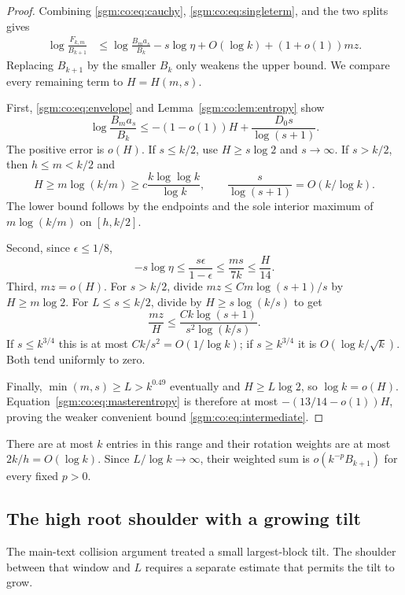 \documentclass[11pt,letterpaper]{article}
\theoremstyle{remark}\newtheorem{remark}[theorem]{Remark}
\theoremstyle{definition}\newtheorem{definition}[theorem]{Definition}
\begin{document}
\begin{proof}
Combining \eqref{sgm:co:eq:cauchy}, \eqref{sgm:co:eq:singleterm}, and the two splits gives
\begin{align}
 \log\frac{F_{k,m}}{B_{k+1}}
 &\le\log\frac{B_ma_s}{B_k}-s\log\eta
       +O(\log k)+(1+o(1))mz.\label{sgm:co:eq:masterentropy}
\end{align}
Replacing $B_{k+1}$ by the smaller $B_k$ only weakens the upper bound. We compare every remaining term to $H=H(m,s)$.

First, \eqref{sgm:co:eq:envelope} and Lemma~\ref{sgm:co:lem:entropy} show
\[
 \log\frac{B_ma_s}{B_k}\le-(1-o(1))H+\frac{D_0s}{\log(s+1)}.
\]
The positive error is $o(H)$. If $s\le k/2$, use $H\ge s\log2$ and $s\to\infty$. If $s>k/2$, then $h\le m<k/2$ and
\[
 H\ge m\log(k/m)\ge c\frac{k\log\log k}{\log k},
 \qquad \frac{s}{\log(s+1)}=O(k/\log k).
\]
The lower bound follows by the endpoints and the sole interior maximum of $m\log(k/m)$ on $[h,k/2]$.

Second, since $\epsilon\le1/8$,
\begin{equation}\label{sgm:co:eq:etaloss}
 -s\log\eta\le\frac{s\epsilon}{1-\epsilon}
 \le\frac{ms}{7k}\le\frac H{14}.
\end{equation}
Third, $mz=o(H)$. For $s>k/2$, divide $mz\le Cm\log(s+1)/s$ by $H\ge m\log2$. For $L\le s\le k/2$, divide by $H\ge s\log(k/s)$ to get
\[
 \frac{mz}{H}\le\frac{Ck\log(s+1)}{s^2\log(k/s)}.
\]
If $s\le k^{3/4}$ this is at most $Ck/s^2=O(1/\log k)$; if $s\ge k^{3/4}$ it is $O(\log k/\sqrt k)$. Both tend uniformly to zero.

Finally, $\min(m,s)\ge L>k^{0.49}$ eventually and $H\ge L\log2$, so $\log k=o(H)$. Equation~\eqref{sgm:co:eq:masterentropy} is therefore at most $-(13/14-o(1))H$, proving the weaker convenient bound \eqref{sgm:co:eq:intermediate}.
\end{proof}
There are at most $k$ entries in this range and their rotation weights are at most $2k/h=O(\log k)$. Since $L/\log k\to\infty$, their weighted sum is $o(k^{-p}B_{k+1})$ for every fixed $p>0$.

\subsection{The high root shoulder with a growing tilt}\label{sgm:co:sec:shoulder}
The main-text collision argument treated a small largest-block tilt. The shoulder between that window and $L$ requires a separate estimate that permits the tilt to grow.
\end{document}
